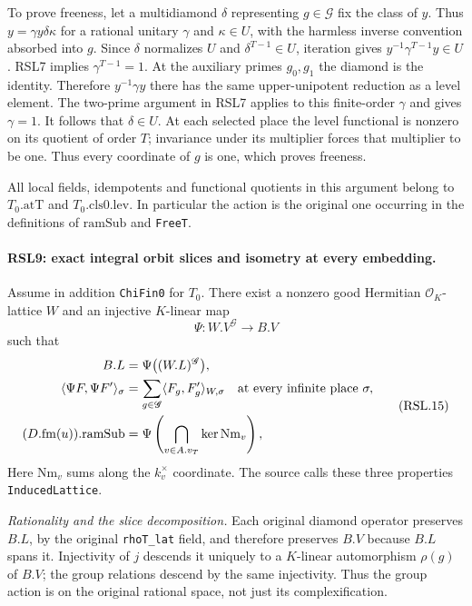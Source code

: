 To prove freeness, let a multidiamond $\delta$ representing
$g\in\mathscr G$ fix the class of $y$.  Thus
$y=\gamma y\delta\kappa$ for a rational unitary $\gamma$
and $\kappa\in U$, with the harmless inverse convention
absorbed into $g$.  Since $\delta$ normalizes $U$ and
$\delta^{T-1}\in U$, iteration gives
$y^{-1}\gamma^{T-1}y\in U$.  RSL7 implies
$\gamma^{T-1}=1$.  At the auxiliary primes $g_0,g_1$ the
diamond is the identity.  Therefore $y^{-1}\gamma y$ there
has the same upper-unipotent reduction as a level element.
The two-prime argument in RSL7 applies to this finite-order
$\gamma$ and gives $\gamma=1$.  It follows that
$\delta\in U$.  At each selected place the level functional
is nonzero on its quotient of order $T$; invariance under
its multiplier forces that multiplier to be one.  Thus every
coordinate of $g$ is one, which proves freeness.

All local fields, idempotents and functional quotients in this
argument belong to $T_0.\mathrm{atT}$ and
$T_0.\mathrm{cls0}.\mathrm{lev}$.  In particular the action is
the original one occurring in the definitions of
$\mathrm{ramSub}$ and \texttt{FreeT}.

\paragraph{RSL9: exact integral orbit slices and isometry at every embedding.}
\label{claim:RSL9}
Assume in addition \texttt{ChiFin0} for $T_0$.  There exist a
nonzero good Hermitian $\mathcal O_K$-lattice $W$ and an
injective $K$-linear map
\[
 \Psi:W.V^{\mathscr G}\longrightarrow B.V
                                                                  \tag{RSL.14}
\]
such that
\[
 \begin{split}
 B.L&=\Psi\bigl((W.L)^{\mathscr G}\bigr),\\
 \langle\Psi F,\Psi F'\rangle_\sigma
   &=\sum_{g\in\mathscr G}\langle F_g,F'_g\rangle_{W,\sigma}
       \quad\hbox{at every infinite place }\sigma,\\
 (D.\mathrm{fm}(u)).\mathrm{ramSub}
   &=\Psi\left(\bigcap_{v\in A.v_T}\ker\mathrm{Nm}_v\right),
 \end{split}                                                     \tag{RSL.15}
\]
Here $\mathrm{Nm}_v$ sums along the $k_v^\times$ coordinate.
The source calls these three properties
\texttt{InducedLattice}.

\emph{Rationality and the slice decomposition.}
Each original diamond operator preserves $B.L$, by the original
\texttt{rhoT\_lat} field, and therefore preserves $B.V$ because
$B.L$ spans it.  Injectivity of $j$ descends it uniquely to a
$K$-linear automorphism $\rho(g)$ of $B.V$; the group relations
descend by the same injectivity.  Thus the group action is on
the original rational space, not just its complexification.

